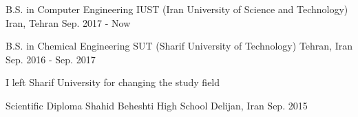 

\begin{cventries}

  \cventry
    {B.S. in Computer Engineering} %
    {IUST (Iran University of Science and Technology)} %
    {Iran, Tehran} %
    {Sep. 2017 - Now} %
    {
    }

  \cventry
    {B.S. in Chemical Engineering} %
    {SUT (Sharif University of Technology)} %
    {Tehran, Iran} %
    {Sep. 2016 - Sep. 2017} %
    {
      \begin{cvitems} %
        \item {I left Sharif University for changing the study field}
      \end{cvitems}
    }

    \cventry
    {Scientific Diploma} %
    {Shahid ‌Beheshti High School} %
    {Delijan, Iran} %
    {Sep. 2015} %
    {
    }

\end{cventries}
